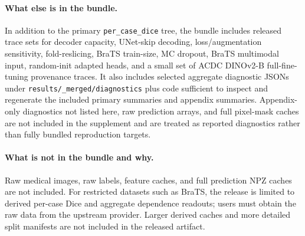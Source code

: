 \paragraph{What else is in the bundle.} In addition to the primary
\texttt{per\_case\_dice} tree, the bundle includes released trace sets for
decoder capacity, UNet-skip decoding, loss/augmentation sensitivity,
fold-reslicing, BraTS train-size, MC dropout, BraTS multimodal input,
random-init adapted heads, and a small set of ACDC DINOv2-B full-fine-tuning
provenance traces. It also includes selected aggregate diagnostic JSONs under
\texttt{results/\_merged/diagnostics} plus code sufficient to inspect and
regenerate the included primary summaries and appendix summaries. Appendix-only
diagnostics not listed here, raw prediction arrays, and full pixel-mask caches
are not included in the supplement and are treated as reported diagnostics
rather than fully bundled reproduction targets.

\paragraph{What is not in the bundle and why.} Raw medical images, raw labels,
feature caches, and full prediction NPZ caches are not included.
For restricted datasets such as BraTS, the release is limited to derived
per-case Dice and aggregate dependence readouts; users must obtain the raw data
from the upstream provider. Larger derived caches and more detailed split manifests are
not included in the released artifact.
